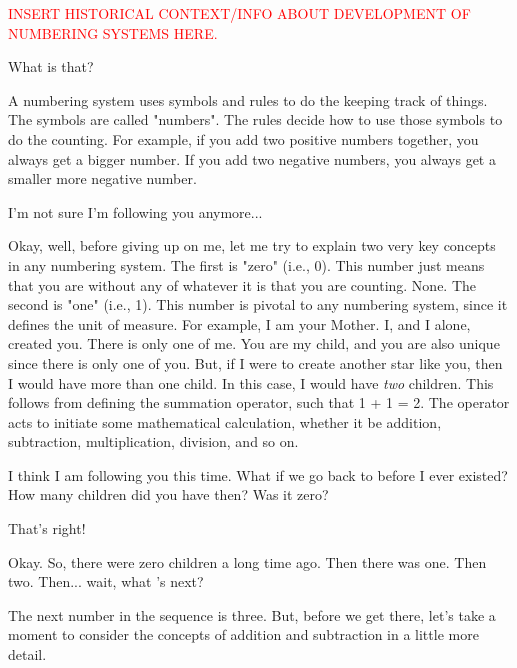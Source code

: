 \documentclass[main.tex]{subfiles}
\begin{document}
\begin{tcolorbox}[sharp corners, colback=red!30, colframe=red!80!blue, title=Numbering Systems]
\par \textcolor{red} {INSERT HISTORICAL CONTEXT/INFO ABOUT DEVELOPMENT OF NUMBERING SYSTEMS HERE.}
\end{tcolorbox}

\par \Maia What is that?

\par \Pleione A numbering system uses symbols and rules to do the keeping track of things.  The symbols are called "numbers".  The rules decide how to use those symbols to do the counting.  For example, if you add two positive numbers together, you always get a bigger number.  If you add two negative numbers, you always get a smaller more negative number.  

\par \Maia I'm not sure I'm following you anymore...

\par \Pleione Okay, well, before giving up on me, let me try to explain two very key concepts in any numbering system.  The first is "zero" (i.e., 0).  This number just means that you are without any of whatever it is that you are counting.  None.  The second is "one" (i.e., 1).  This number is pivotal to any numbering system, since it defines the unit of measure.  For example, I am your Mother.  I, and I alone, created you.  There is only one of me.  You are my child, and you are also unique since there is only one of you.  But, if I were to create another star like you, then I would have more than one child.  In this case, I would have \textit{two} children.  This follows from defining the summation operator, such that 1 + 1 = 2.  The operator acts to initiate some mathematical calculation, whether it be addition, subtraction, multiplication, division, and so on.

\par \Maia I think I am following you this time.  What if we go back to before I ever existed?  How many children did you have then?  Was it zero?

\par \Pleione That's right!

\par \Maia Okay.  So, there were zero children a long time ago.  Then there was one.  Then two.  Then... wait, what 's next?

\par \Pleione The next number in the sequence is three.  But, before we get there, let's take a moment to consider the concepts of addition and subtraction in a little more detail.
\end{document}
